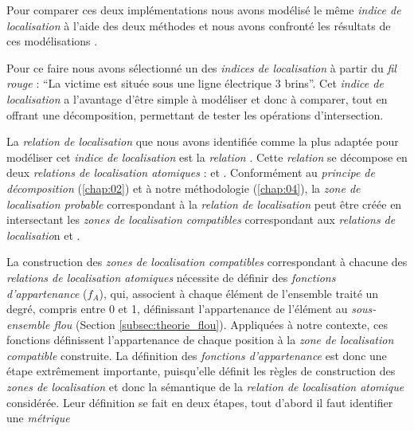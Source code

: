 Pour comparer ces deux implémentations nous avons modélisé le même
\emph{indice de localisation} à l'aide des deux méthodes et nous avons
confronté les résultats de ces modélisations \autocite{Bunel2019a}.

Pour ce faire nous avons sélectionné un des \emph{indices de
  localisation} à partir du \emph{fil rouge} : \enquote{La victime est
  située sous une ligne électrique 3 brins}. Cet \emph{indice de
  localisation} a l'avantage d'être simple à modéliser et donc à
comparer, tout en offrant une décomposition, permettant de tester les
opérations d'intersection.

La \emph{relation de localisation} que nous avons identifiée comme la plus
adaptée pour modéliser cet \emph{indice de localisation} est la
\emph{relation} . Cette \emph{relation} se
décompose en deux \emph{relations de localisation atomiques} :
 et
. Conformément
au \emph{principe de décomposition} (\autoref{chap:02}) et à notre
méthodologie (\autoref{chap:04}), la \emph{zone de localisation probable}
correspondant à la \emph{relation de localisation}
 peut être créée en intersectant les \emph{zones
  de localisation compatibles} correspondant aux \emph{relations de
  localisatio}n 
et .

La construction des \emph{zones de localisation compatibles} correspondant à
chacune des \emph{relations de localisation atomiques} nécessite de définir
des \emph{fonctions d'appartenance} ($f_A$), qui, associent à chaque élément
de l'ensemble traité un degré, compris entre 0 et 1, définissant
l'appartenance de l'élément au \emph{sous-ensemble flou} (Section
\ref{subsec:theorie_flou}). Appliquées à notre contexte, ces fonctions
définissent l'appartenance de chaque position à la \emph{zone de localisation
  compatible} construite. La définition des \emph{fonctions d'appartenance}
est donc une étape extrêmement importante, puisqu'elle définit les règles de
construction des \emph{zones de localisation} et donc la sémantique de la
\emph{relation de localisation atomique} considérée. Leur définition se fait
en deux étapes, tout d'abord il faut identifier une \emph{métrique}

